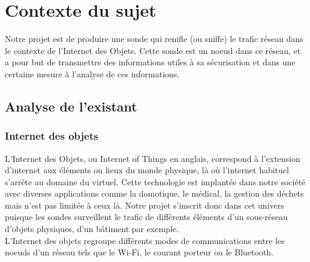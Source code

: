 \chapter{Contexte du sujet}
\label{chap:contexte}
	Notre projet est de produire une sonde qui renifle (ou sniffe) le trafic réseau dans le contexte de l'Internet des Objets. Cette sonde est un noeud dans ce réseau, et a pour but de transmettre des informations utiles à sa sécurisation et dans une certaine mesure à l'analyse de ces informations.

\section{Analyse de l'existant}
	
	\subsection{Internet des objets}
		L'Internet des Objets, ou Internet of Things en anglais, correspond à l'extension d'internet aux éléments ou lieux du monde physique, là où l'internet habituel s'arrête au domaine du virtuel.
		Cette technologie est implantée dans notre société avec diverses applications comme la domotique, le médical, la gestion des déchets mais n'est pas limitée à ceux là.
		Notre projet s'inscrit donc dans cet univers puisque les sondes surveillent le trafic de différents éléments d'un sous-réseau d'objets physiques, d'un bâtiment par exemple. \\
		L'Internet des objets regroupe différents modes de communications entre les noeuds d'un réseau tels que le Wi-Fi, le courant porteur ou le Bluetooth.%
		
